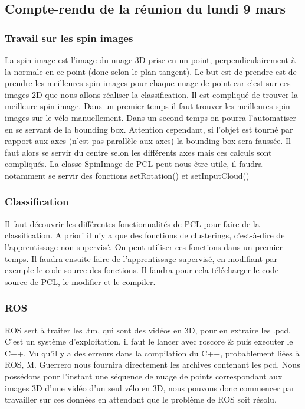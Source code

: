 \subsection{Compte-rendu de la réunion du lundi 9 mars}

\subsubsection{Travail sur les spin images}

La spin image est l’image du nuage 3D prise en un point, perpendiculairement à la normale en ce point (donc selon le plan tangent).
Le but est de prendre est de prendre les meilleures spin images pour chaque nuage de point car c’est sur ces images 2D que nous allons réaliser la classification. Il est compliqué de trouver la meilleure spin image. Dans un premier temps il faut trouver les meilleures spin images sur le vélo manuellement. Dans un second temps on pourra l’automatiser en se servant de la bounding box. Attention cependant, si l’objet est tourné par rapport aux axes (n’est pas parallèle aux axes) la bounding box sera faussée. Il faut alors se servir du centre selon les différents axes mais ces calculs sont compliqués.
La classe SpinImage de PCL peut nous être utile, il faudra notamment se servir des fonctions setRotation() et setInputCloud()

\subsubsection{ Classification}

Il faut découvrir les différentes fonctionnalités de PCL pour faire de la classification. A priori il n’y a que des fonctions de clusterings, c'est-à-dire de l'apprentissage non-supervisé. On peut utiliser ces fonctions dans un premier temps. Il faudra ensuite faire de l'apprentissage supervisé, en modifiant par exemple le code source des fonctions. Il faudra pour cela télécharger le code source de PCL, le modifier et le compiler.

\subsubsection{ROS}

ROS sert à traiter les .tm, qui sont des vidéos en 3D, pour en extraire les .pcd. C’est un système d’exploitation, il faut le lancer avec roscore \& puis executer le C++. Vu qu’il y a des erreurs dans la compilation du C++, probablement liées à ROS, M. Guerrero nous fournira directement les archives contenant les pcd. Nous possédons  pour l’instant une séquence de nuage de points correspondant aux images 3D d’une vidéo d’un seul vélo en 3D, nous pouvons donc commencer par travailler sur ces données en attendant que le problème de ROS soit résolu.